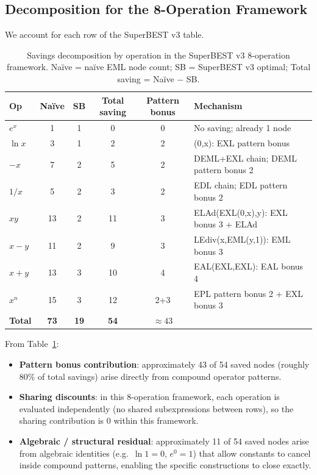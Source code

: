 \documentclass[12pt,a4paper]{article}
\theoremstyle{definition}
\newcommand{\EXL}{\operatorname{EXL}}
\begin{document}
\subsection{Decomposition for the 8-Operation Framework}

We account for each row of the SuperBEST v3 table.

\begin{table}[h]
\centering
\caption{Savings decomposition by operation in the SuperBEST v3 8-operation framework.
         Na\"{i}ve = na\"{i}ve EML node count; SB = SuperBEST v3 optimal;
         Total saving = Na\"{i}ve $-$ SB.}
\label{tab:decomp}
\smallskip
\begin{tabular}{@{}lccccl@{}}
\toprule
\textbf{Op} & \textbf{Na\"{i}ve} & \textbf{SB} & \textbf{Total saving}
  & \textbf{Pattern bonus} & \textbf{Mechanism} \\
\midrule
$e^x$       &  1 &  1 &  0 & 0 & No saving; already 1 node \\
$\ln x$     &  3 &  1 &  2 & 2 & \EXL(0,x): EXL pattern bonus \\
$-x$        &  7 &  2 &  5 & 2 & DEML+EXL chain; DEML pattern bonus 2 \\
$1/x$       &  5 &  2 &  3 & 2 & EDL chain; EDL pattern bonus 2 \\
$xy$        & 13 &  2 & 11 & 3 & ELAd(EXL(0,x),y): EXL bonus 3 + ELAd \\
$x-y$       & 11 &  2 &  9 & 3 & LEdiv(x,EML(y,1)): EML bonus 3 \\
$x+y$       & 13 &  3 & 10 & 4 & EAL(EXL,EXL): EAL bonus 4 \\
$x^n$       & 15 &  3 & 12 & 2+3 & EPL pattern bonus 2 + EXL bonus 3 \\
\midrule
\textbf{Total} & \textbf{73} & \textbf{19} & \textbf{54} & \textbf{$\approx 43$}
  & \\
\bottomrule
\end{tabular}
\end{table}

From Table~\ref{tab:decomp}:
\begin{itemize}
  \item \textbf{Pattern bonus contribution}: approximately 43 of 54 saved nodes
        (roughly 80\% of total savings) arise directly from compound operator
        patterns.
  \item \textbf{Sharing discounts}: in this 8-operation framework, each
        operation is evaluated independently (no shared subexpressions between
        rows), so the sharing contribution is 0 within this framework.
  \item \textbf{Algebraic / structural residual}: approximately 11 of 54 saved
        nodes arise from algebraic identities (e.g.\ $\ln 1 = 0$,
        $e^0 = 1$) that allow constants to cancel inside compound patterns,
        enabling the specific constructions to close exactly.
\end{itemize}
\end{document}
